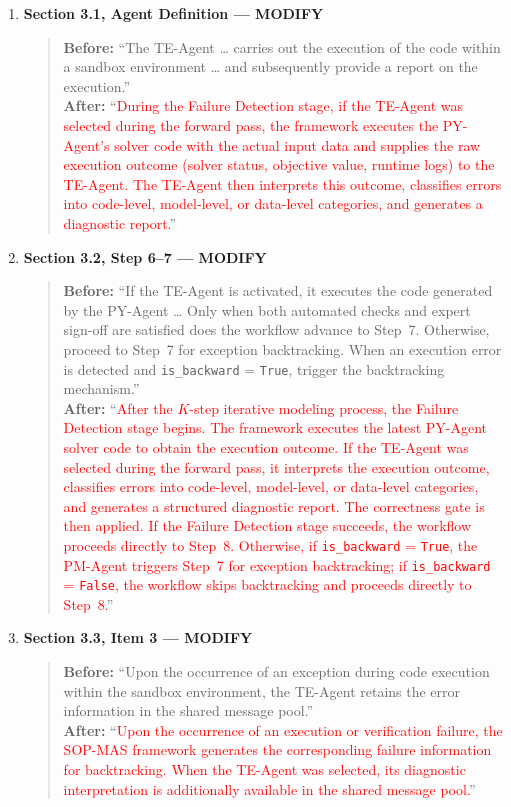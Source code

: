 \documentclass[11pt,a4paper]{article}
\begin{document}
\begin{enumerate}
\item \textbf{Section 3.1, Agent Definition --- MODIFY}
\begin{quote}
\textbf{Before:} ``The TE-Agent \ldots{} carries out the execution of the code within a sandbox environment \ldots{} and subsequently provide a report on the execution.''\\[4pt]
\textbf{After:} ``\textcolor{red}{During the Failure Detection stage, if the TE-Agent was selected during the forward pass, the framework executes the PY-Agent's solver code with the actual input data and supplies the raw execution outcome (solver status, objective value, runtime logs) to the TE-Agent. The TE-Agent then interprets this outcome, classifies errors into code-level, model-level, or data-level categories, and generates a diagnostic report.}'' 
\end{quote}

\item \textbf{Section 3.2, Step 6--7 --- MODIFY}
\begin{quote}
\textbf{Before:} ``If the TE-Agent is activated, it executes the code generated by the PY-Agent \ldots{} Only when both automated checks and expert sign-off are satisfied does the workflow advance to Step~7. Otherwise, proceed to Step~7 for exception backtracking. When an execution error is detected and \texttt{is\_backward} = \texttt{True}, trigger the backtracking mechanism.''\\[4pt]
\textbf{After:} ``\textcolor{red}{After the $K$-step iterative modeling process, the Failure Detection stage begins. The framework executes the latest PY-Agent solver code to obtain the execution outcome. If the TE-Agent was selected during the forward pass, it interprets the execution outcome, classifies errors into code-level, model-level, or data-level categories, and generates a structured diagnostic report. The correctness gate is then applied. If the Failure Detection stage succeeds, the workflow proceeds directly to Step~8. Otherwise, if \texttt{is\_backward} = \texttt{True}, the PM-Agent triggers Step~7 for exception backtracking; if \texttt{is\_backward} = \texttt{False}, the workflow skips backtracking and proceeds directly to Step~8.}''
\end{quote}

\item \textbf{Section 3.3, Item 3 --- MODIFY}
\begin{quote}
\textbf{Before:} ``Upon the occurrence of an exception during code execution within the sandbox environment, the TE-Agent retains the error information in the shared message pool.''\\[4pt]
\textbf{After:} ``\textcolor{red}{Upon the occurrence of an execution or verification failure, the SOP-MAS framework generates the corresponding failure information for backtracking. When the TE-Agent was selected, its diagnostic interpretation is additionally available in the shared message pool.}'' 
\end{quote}

\end{enumerate}
\end{document}
